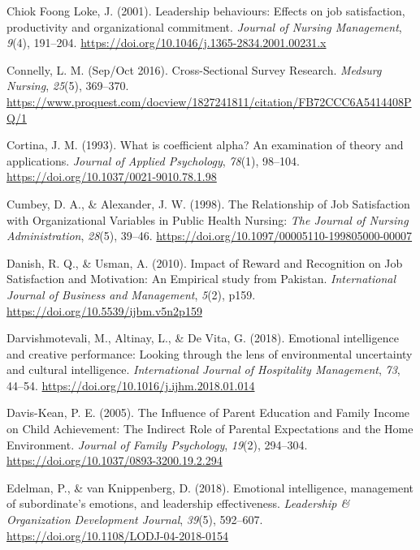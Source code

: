\documentclass[
  man,
  longtable,
  nolmodern,
  notxfonts,
  notimes,
  colorlinks=true,linkcolor=blue,citecolor=blue,urlcolor=blue]{apa7}
\newlength{\cslhangindent}
\newenvironment{CSLReferences}[2] %
 {\begin{list}{}{%
  \setlength{\itemindent}{0pt}
  \setlength{\leftmargin}{0pt}
  \setlength{\parsep}{0pt}
  \ifodd #1
   \setlength{\leftmargin}{\cslhangindent}
   \setlength{\itemindent}{-1\cslhangindent}
  \fi
  \setlength{\itemsep}{#2\baselineskip}}}
 {\end{list}}
\begin{document}
\begin{CSLReferences}{1}{0}
Chiok Foong Loke, J. (2001). Leadership behaviours: Effects on job
satisfaction, productivity and organizational commitment. \emph{Journal
of Nursing Management}, \emph{9}(4), 191--204.
\url{https://doi.org/10.1046/j.1365-2834.2001.00231.x}

Connelly, L. M. (Sep/Oct 2016). Cross-{Sectional Survey Research}.
\emph{Medsurg Nursing}, \emph{25}(5), 369--370.
\url{https://www.proquest.com/docview/1827241811/citation/FB72CCC6A5414408PQ/1}

Cortina, J. M. (1993). What is coefficient alpha? {An} examination of
theory and applications. \emph{Journal of Applied Psychology},
\emph{78}(1), 98--104. \url{https://doi.org/10.1037/0021-9010.78.1.98}

Cumbey, D. A., \& Alexander, J. W. (1998). The {Relationship} of {Job
Satisfaction} with {Organizational Variables} in {Public Health
Nursing}: \emph{The Journal of Nursing Administration}, \emph{28}(5),
39--46. \url{https://doi.org/10.1097/00005110-199805000-00007}

Danish, R. Q., \& Usman, A. (2010). Impact of {Reward} and {Recognition}
on {Job Satisfaction} and {Motivation}: {An Empirical} study from
{Pakistan}. \emph{International Journal of Business and Management},
\emph{5}(2), p159. \url{https://doi.org/10.5539/ijbm.v5n2p159}

Darvishmotevali, M., Altinay, L., \& De Vita, G. (2018). Emotional
intelligence and creative performance: {Looking} through the lens of
environmental uncertainty and cultural intelligence. \emph{International
Journal of Hospitality Management}, \emph{73}, 44--54.
\url{https://doi.org/10.1016/j.ijhm.2018.01.014}

Davis-Kean, P. E. (2005). The {Influence} of {Parent Education} and
{Family Income} on {Child Achievement}: {The Indirect Role} of {Parental
Expectations} and the {Home Environment}. \emph{Journal of Family
Psychology}, \emph{19}(2), 294--304.
\url{https://doi.org/10.1037/0893-3200.19.2.294}

Edelman, P., \& van Knippenberg, D. (2018). Emotional intelligence,
management of subordinate's emotions, and leadership effectiveness.
\emph{Leadership \& Organization Development Journal}, \emph{39}(5),
592--607. \url{https://doi.org/10.1108/LODJ-04-2018-0154}


\end{CSLReferences}
\end{document}
